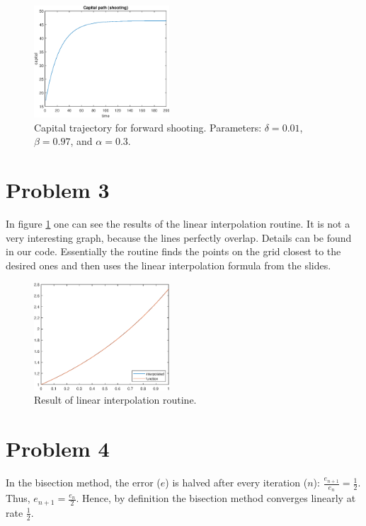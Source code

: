 \documentclass[12pt]{article}
\newcommand{\?}{\stackrel{?}{=}}
\begin{document}
\begin{figure}[H]
    \centering
    \includegraphics[width=0.45\textwidth]{PS1/2_shoot.eps}
    \caption{Capital trajectory for forward shooting. Parameters: $\delta=0.01$, $\beta=0.97$, and $\alpha=0.3$.}
\end{figure}

\section*{Problem 3}
In figure \ref{fig:lin_int} one can see the results of the linear interpolation routine. It is not a very interesting graph, because the lines perfectly overlap. Details can be found in our code. Essentially the routine finds the points on the grid closest to the desired ones and then uses the linear interpolation formula from the slides.

\begin{figure}[H]
    \centering
    \includegraphics[width=0.45\textwidth]{PS1/ps3.eps}
    \caption{Result of linear interpolation routine.}
    \label{fig:lin_int}
\end{figure}


\section*{Problem 4}

In the bisection method, the error ($e$) is halved after every iteration ($n$): $\frac{e_{n+1}}{e_n} = \frac{1}{2}$. Thus, $e_{n+1} = \frac{e_n}{2}$. Hence, by definition the bisection method converges linearly at rate $\frac{1}{2}$.
\end{document}
